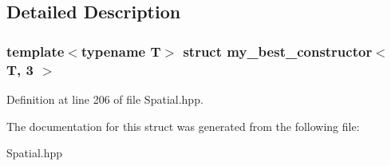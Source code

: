 \subsection{Detailed Description}
\subsubsection*{template$<$typename T$>$\newline
struct my\+\_\+best\+\_\+constructor$<$ T, 3 $>$}



Definition at line 206 of file Spatial.\+hpp.



The documentation for this struct was generated from the following file\+:\begin{DoxyCompactItemize}
\item 
Spatial.\+hpp\end{DoxyCompactItemize}
